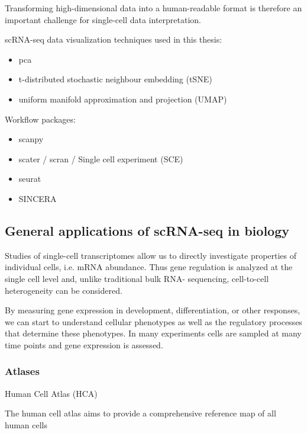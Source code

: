 Transforming high-dimensional data into a human-readable format is therefore an important challenge for single-cell data interpretation.

scRNA-seq data visualization techniques used in this thesis: 



\begin{itemize}
    \item \gls{pca}
    \item t-distributed stochastic neighbour embedding (tSNE) \cite{maaten2008visualizing}
    \item uniform manifold approximation and projection (UMAP) \cite{mcinnes2018umap}
\end{itemize}


Workflow packages:

\begin{itemize}
    \item scanpy
    \item scater / scran / Single cell experiment (SCE)
    \item seurat
    \item SINCERA
\end{itemize}




\subsection{General applications of scRNA-seq in biology}

Studies of single-cell transcriptomes allow us to directly investigate properties of individual cells, i.e. mRNA abundance. 
Thus gene regulation is analyzed at the single cell level and, unlike traditional bulk RNA- sequencing, cell-to-cell heterogeneity can be considered.

By measuring gene expression in development, differentiation, or other responses, we can start to understand cellular phenotypes as well as the regulatory processes that determine these phenotypes. 
In many experiments cells are sampled at many time points and gene expression is assessed.

 


\subsubsection{Atlases}

Human Cell Atlas (HCA)

The human cell atlas aims to provide a comprehensive reference map of all human cells
\cite{rozenblatt2017human}
